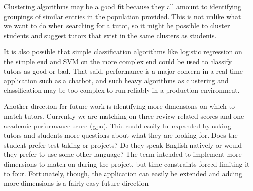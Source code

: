 Clustering algorithms may be a good fit because they all amount to identifying
groupings of similar entries in the population provided.  This is not unlike
what we want to do when searching for a tutor, so it might be possible to
cluster students and suggest tutors that exist in the same clusters as students.  

It is also possible that simple classification algorithms like logistic
regression on the simple end and SVM on the more complex end could be used to
classify tutors as good or bad.  That said, performance is a major concern in a
real-time application such as a chatbot, and such heavy algorithms as clustering
and classification may be too complex to run reliably in a production
environment.  

Another direction for future work is identifying more dimensions on which to
match tutors.  Currently we are matching on three review-related scores and one
academic performance score (gpa).  This could easily be expanded by asking
tutors and students more questions about what they are looking for.  Does the
student prefer test-taking or projects?  Do they speak English natively or would
they prefer to use some other language?  The team intended to implement more
dimensions to match on during the project, but time constraints forced limiting
it to four.  Fortunately, though, the application can easily be extended and
adding more dimensions is a fairly easy future direction.

